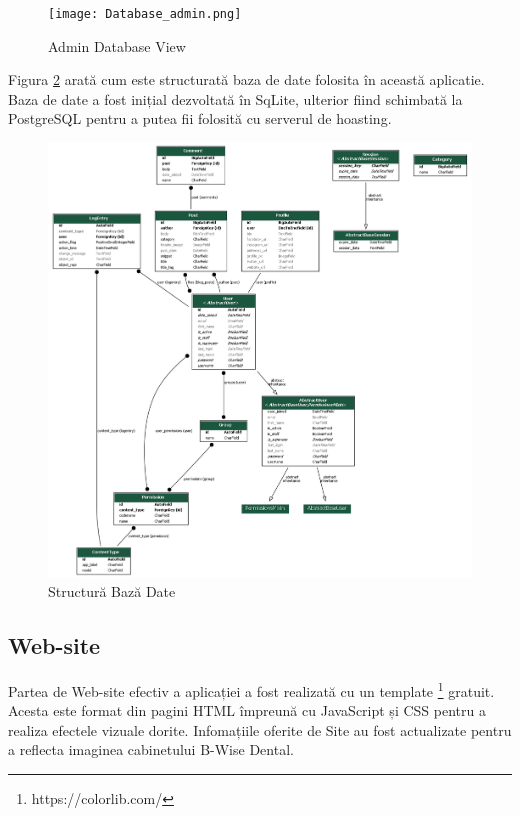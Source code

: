 \documentclass[11pt]{scrartcl} %
\begin{document}
\begin{figure}[h] %
	\centering
	\texttt{[image: Database\_admin.png]} %
	\caption{Admin Database View}
	\label{fig:dbadmin}
\end{figure}

Figura \ref{fig:dbstruct} arată cum este structurată baza de date folosita în această aplicatie. Baza de date a fost inițial dezvoltată în SqLite, ulterior fiind schimbată la PostgreSQL pentru a putea fii folosită cu serverul de hoasting. 

\begin{figure}[h] %
	\centering
	\includegraphics[width=0.8\columnwidth]{my_project_visualized.png} %
	\caption{Structură Bază Date}
	\label{fig:dbstruct}
\end{figure}

\subsection{Web-site}

Partea de Web-site efectiv a aplicației a fost realizată cu un template \footnote{https://colorlib.com/} gratuit. Acesta este format din pagini HTML împreună cu JavaScript și CSS pentru a realiza efectele vizuale dorite. Infomațiile oferite de Site au fost actualizate pentru a reflecta imaginea cabinetului B-Wise Dental.
\end{document}
